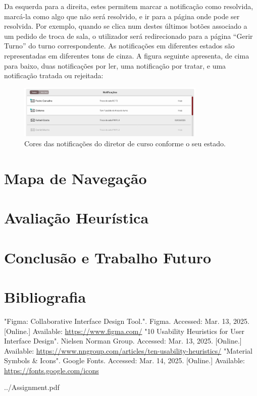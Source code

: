 \documentclass[12pt, a4paper]{article}
\begin{document}
Da esquerda para a direita, estes permitem marcar a notificação como resolvida, marcá-la como algo
que não será resolvido, e ir para a página onde pode ser resolvida. Por exemplo, quando se clica num
destes últimos botões associado a um pedido de troca de sala, o utilizador será redirecionado para a
página ``Gerir Turno'' do turno correspondente. As notificações em diferentes estados são
representadas em diferentes tons de cinza. A figura seguinte apresenta, de cima para baixo, duas
notificações por ler, uma notificação por tratar, e uma notificação tratada ou rejeitada:

\begin{figure}[H]
    \centering
    \includegraphics[width=0.8\textwidth]{res/prototype/notificacoes-diretor-cor.png}
    \caption{Cores das notificações do diretor de curso conforme o seu estado.}
    \label{notificacoes-diretor-cor}
\end{figure}

\section{Mapa de Navegação}

\section{Avaliação Heurística}

\section{Conclusão e Trabalho Futuro}

\begingroup
\section{Bibliografia}
\renewcommand{\section}[2]{}

\begin{thebibliography}{9}
        "Figma: Collaborative Interface Design Tool."{}. Figma. Accessed: Mar. 13, 2025. [Online.]
        Available: \url{https://www.figma.com/}
        "10 Usability Heuristics for User Interface Design". Nielsen Norman Group.
        Accessed: Mar. 13, 2025. [Online.] Available:
        \url{https://www.nngroup.com/articles/ten-usability-heuristics/}
        "Material Symbols \& Icons"{}. Google Fonts. Accessed: Mar. 14, 2025. [Online.] Available:
        \url{https://fonts.google.com/icons}
\end{thebibliography}
\endgroup


    {../Assignment.pdf}

\end{document}
